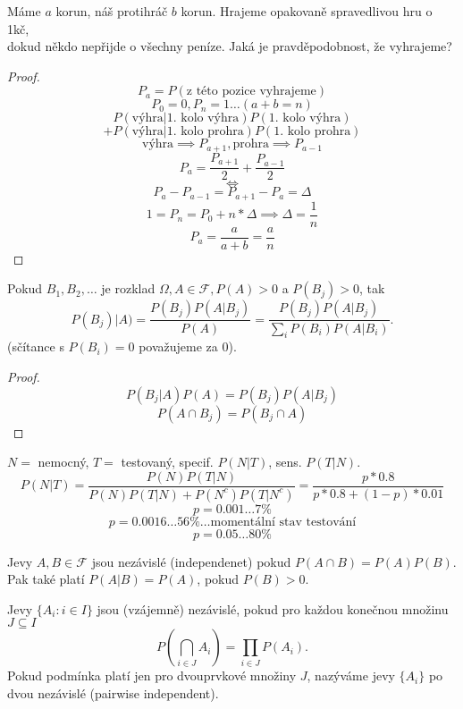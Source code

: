 \documentclass[../main.tex]{subfiles}
\begin{document}
\begin{example}
    Máme $a$ korun, náš protihráč $b$ korun. Hrajeme opakovaně spravedlivou hru o 1kč,\\
    dokud někdo nepřijde o všechny peníze. Jaká je pravděpodobnost, že vyhrajeme?
\end{example}
\begin{proof}
    \[P_a = P(\text{z této pozice vyhrajeme})\]
    \[P_0 = 0, P_n = 1 \dots (a+b = n)\]
    \[P(\text{výhra}|\text{1. kolo výhra})P(\text{1. kolo výhra})\]
    \[+ P(\text{výhra}|\text{1. kolo prohra})P(\text{1. kolo prohra})\]
    \[\text{výhra}\implies P_{a+1}, \text{prohra}\implies P_{a-1}\]
    \[P_a = \frac{P_{a+1}}{2} + \frac{P_{a-1}}{2}\]
    \[ \Leftrightarrow \]
    \[P_a - P_{a-1} = P_{a+1} - P_a = \Delta\]
    \[1 = P_n = P_0 + n*\Delta \implies \Delta = \frac{1}{n}\]
    \[P_a = \frac{a}{a+b} = \frac{a}{n}\]
\end{proof}

\begin{theorem}
    Pokud $B_1,B_2,\dots $ je rozklad $\Omega, A \in \mathcal{F}, P(A) > 0$ a $P(B_j) > 0$, tak
    \[P(B_j)| A) = \frac{P(B_j)P(A|B_j)}{P(A)} = \frac{P(B_j)P(A|B_j)}{\sum_i P(B_i)P(A|B_i)}.\]
    (sčítance s $P(B_i) = 0$ považujeme za $0$).
\end{theorem}
\begin{proof}
    \[P(B_j | A)P(A) = P(B_j)P(A|B_j)\]
    \[P(A\cap B_j) = P(B_j \cap A)\]
\end{proof}


\begin{example}
    $N=$ nemocný, $T=$ testovaný, specif. $P(N|T)$, sens. $P(T|N)$.
    \[P(N|T) = \frac{P(N)P(T|N)}{P(N)P(T|N)+ P(N^c)P(T|N^c)} = \frac{p*0.8}{p*0.8 + (1-p)*0.01}\]
    \[p = 0.001 \dots 7\%\]
    \[p = 0.0016 \dots 56\% \dots \text{momentální stav testování}\]
    \[p = 0.05 \dots 80\%\] 
\end{example}

\begin{definition}
    Jevy $A,B \in \mathcal{F}$ jsou nezávislé (independenet) pokud $P(A\cap B) = P(A)P(B)$.\\
    Pak také platí $P(A|B) = P(A)$, pokud $P(B)>0$.
\end{definition}

\begin{definition}
    Jevy $\{A_i : i \in I\}$ jsou (vzájemně) nezávislé, pokud pro každou konečnou množinu $J \subseteq I$
    \[P\left(\bigcap_{i\in J} A_i\right) = \prod_{i\in J} P(A_i).\]
    Pokud podmínka platí jen pro dvouprvkové množiny $J$, nazýváme jevy $\{A_i\}$ po dvou nezávislé (pairwise independent).
\end{definition}
\end{document}
